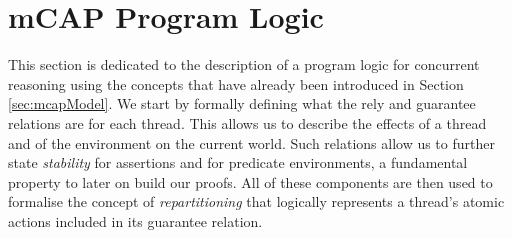 \section{mCAP Program Logic}

\label{sec:mcapLogic}

This section is dedicated to the description of a program logic for concurrent reasoning using the concepts that have already been introduced in Section \ref{sec:mcapModel}. We start by formally defining what the rely and guarantee relations are for each thread. This allows us to describe the effects of a thread and of the environment on the current world. Such relations allow us to further state \textit{stability} for assertions and for predicate environments, a fundamental property to later on build our proofs. All of these components are then used to formalise the concept of \textit{repartitioning} \cite{cap}\cite{colosl} that logically represents a thread's atomic actions included in its guarantee relation.



\newpage



\newpage



\newpage



\newpage

